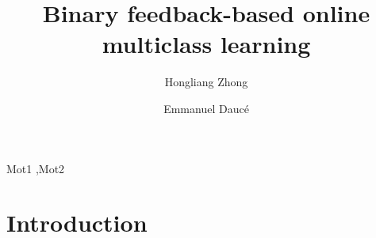 \documentclass[preprint,12pt,authoryear]{elsarticle}
\begin{document}
\begin{frontmatter}



\title{Binary feedback-based online multiclass learning}


\author[centrale,lif]{Hongliang Zhong}
\author[centrale,ins]{Emmanuel Dauc\'e }

\address[centrale]{Ecole Centrale de Marseille}
\address[lif]{Laboratoire d'informatique Fondamentale}
\address[ins]{Institut de Neurosciences des Syst\`emes}


\begin{abstract}

\end{abstract}

\begin{keyword}
Mot1 \sep Mot2


\end{keyword}

\end{frontmatter}


\section{Introduction}
\label{sec:lentete}
\end{document}
